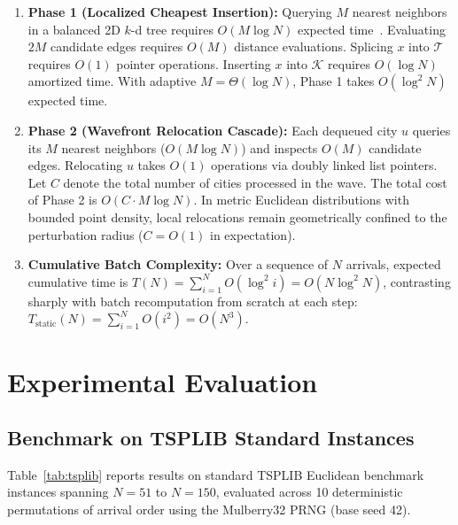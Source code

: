 \documentclass{article}
\theoremstyle{definition}
\begin{document}
\begin{enumerate}
    \item \textbf{Phase 1 (Localized Cheapest Insertion):}
    Querying $M$ nearest neighbors in a balanced 2D $k$-d tree requires $O(M \log N)$ expected time~\cite{bentley1975multidimensional}. Evaluating $2M$ candidate edges requires $O(M)$ distance evaluations. Splicing $x$ into $\mathcal{T}$ requires $O(1)$ pointer operations. Inserting $x$ into $\mathcal{K}$ requires $O(\log N)$ amortized time. With adaptive $M = \Theta(\log N)$, Phase 1 takes $O(\log^2 N)$ expected time.
    \item \textbf{Phase 2 (Wavefront Relocation Cascade):}
    Each dequeued city $u$ queries its $M$ nearest neighbors ($O(M \log N)$) and inspects $O(M)$ candidate edges. Relocating $u$ takes $O(1)$ operations via doubly linked list pointers. Let $C$ denote the total number of cities processed in the wave. The total cost of Phase 2 is $O(C \cdot M \log N)$. In metric Euclidean distributions with bounded point density, local relocations remain geometrically confined to the perturbation radius ($C = O(1)$ in expectation).
    \item \textbf{Cumulative Batch Complexity:} Over a sequence of $N$ arrivals, expected cumulative time is $T(N) = \sum_{i=1}^N O(\log^2 i) = O(N \log^2 N)$, contrasting sharply with batch recomputation from scratch at each step: $T_{\text{static}}(N) = \sum_{i=1}^N O(i^2) = O(N^3)$.
\end{enumerate}

\section{Experimental Evaluation}

\subsection{Benchmark on TSPLIB Standard Instances}

Table~\ref{tab:tsplib} reports results on standard TSPLIB Euclidean benchmark instances spanning $N = 51$ to $N = 150$, evaluated across 10 deterministic permutations of arrival order using the Mulberry32 PRNG (base seed 42).
\end{document}
